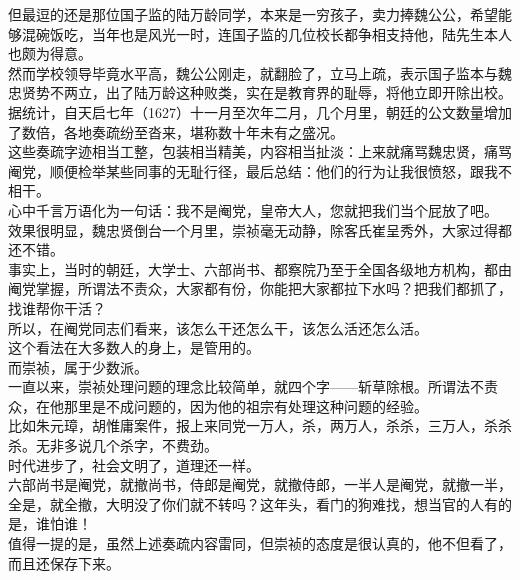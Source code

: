 \begin{multicols}{\theparacolNo}
但最逗的还是那位国子监的陆万龄同学，本来是一穷孩子，卖力捧魏公公，希望能够混碗饭吃，当年也是风光一时，连国子监的几位校长都争相支持他，陆先生本人也颇为得意。\\

然而学校领导毕竟水平高，魏公公刚走，就翻脸了，立马上疏，表示国子监本与魏忠贤势不两立，出了陆万龄这种败类，实在是教育界的耻辱，将他立即开除出校。\\

据统计，自天启七年（1627）十一月至次年二月，几个月里，朝廷的公文数量增加了数倍，各地奏疏纷至沓来，堪称数十年未有之盛况。\\

这些奏疏字迹相当工整，包装相当精美，内容相当扯淡：上来就痛骂魏忠贤，痛骂阉党，顺便检举某些同事的无耻行径，最后总结：他们的行为让我很愤怒，跟我不相干。\\

心中千言万语化为一句话：我不是阉党，皇帝大人，您就把我们当个屁放了吧。\\

效果很明显，魏忠贤倒台一个月里，崇祯毫无动静，除客氏崔呈秀外，大家过得都还不错。\\

事实上，当时的朝廷，大学士、六部尚书、都察院乃至于全国各级地方机构，都由阉党掌握，所谓法不责众，大家都有份，你能把大家都拉下水吗？把我们都抓了，找谁帮你干活？\\

所以，在阉党同志们看来，该怎么干还怎么干，该怎么活还怎么活。\\

这个看法在大多数人的身上，是管用的。\\

而崇祯，属于少数派。\\

一直以来，崇祯处理问题的理念比较简单，就四个字——斩草除根。所谓法不责众，在他那里是不成问题的，因为他的祖宗有处理这种问题的经验。\\

比如朱元璋，胡惟庸案件，报上来同党一万人，杀，两万人，杀杀，三万人，杀杀杀。无非多说几个杀字，不费劲。\\

时代进步了，社会文明了，道理还一样。\\

六部尚书是阉党，就撤尚书，侍郎是阉党，就撤侍郎，一半人是阉党，就撤一半，全是，就全撤，大明没了你们就不转吗？这年头，看门的狗难找，想当官的人有的是，谁怕谁！\\

值得一提的是，虽然上述奏疏内容雷同，但崇祯的态度是很认真的，他不但看了，而且还保存下来。\\


\end{multicols}
